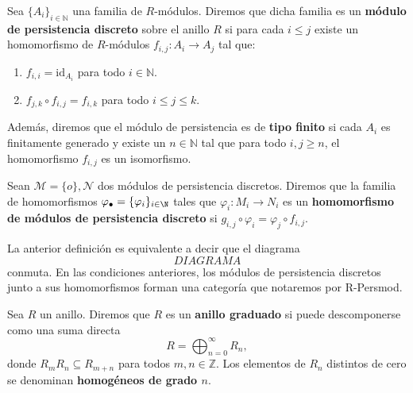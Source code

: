 \begin{definicion}
	Sea \( \{A_i\}_{i \in \mathbb{N}} \) una familia de \( R \)-módulos. Diremos que dicha familia es un \textbf{módulo de persistencia discreto} sobre el anillo \( R \) si para cada \( i \leq j \) existe un homomorfismo de \( R \)-módulos \( f_{i,j}: A_i \to A_j \) tal que:
	\begin{enumerate}
		\item \( f_{i,i} = \mathrm{id}_{A_i} \) para todo \( i \in \mathbb{N} \).
		\item \( f_{j,k} \circ f_{i,j} = f_{i,k} \) para todo \( i \leq j \leq k \).
	\end{enumerate}
	Además, diremos que el módulo de persistencia es de \textbf{tipo finito} si cada \( A_i \) es finitamente generado y existe un \( n \in \mathbb{N} \) tal que para todo \( i, j \geq n \), el homomorfismo \( f_{i,j} \) es un isomorfismo.
\end{definicion}

\begin{definicion}
	Sean \(\mathcal{M} = \{o\}, \mathcal{N}\) dos módulos de persistencia discretos.  Diremos que la familia de homomorfismos \(\varphi_\bullet = \{\varphi_i\}_{i \in \N}\) tales que \(\varphi_i : M_i \to N_i\) es un \textbf{homomorfismo de módulos de persistencia discreto} si \(g_{i,j} \circ \varphi_i = \varphi_j \circ f_{i,j}\).
\end{definicion}
La anterior definición es equivalente a decir que el diagrama
\[DIAGRAMA\]
conmuta. En las condiciones anteriores, los módulos de persistencia discretos junto a sus homomorfismos forman una categoría que notaremos por R-Persmod.

\begin{definicion}
	Sea \( R \) un anillo. Diremos que \( R \) es un \textbf{anillo graduado} si puede descomponerse como una suma directa
	\[
	R = \bigoplus_{n=0}^{\infty} R_n,
	\]
	donde \( R_m R_n \subseteq R_{m+n} \) para todos \( m, n \in \mathbb{Z} \). Los elementos de \( R_n \) distintos de cero se denominan \textbf{homogéneos de grado \( n \)}.
\end{definicion}

